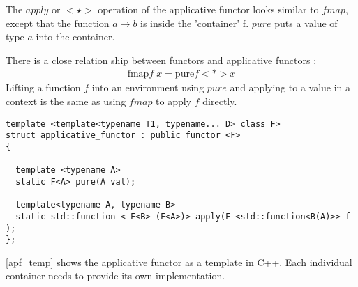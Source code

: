 \documentclass[12pt,fleqn]{article}
\begin{document}
The $apply$ or $<\star>$ operation of the applicative functor looks similar to $fmap$, except that the function $a \rightarrow b$ is inside the 'container' f.
$pure$ puts a value of type $a$ into the container.

There is a close relation ship between functors and applicative functors :
\begin{eqnarray*}
  \mbox{fmap} f \; x = \mbox{pure} f <*> x
\end{eqnarray*} 
Lifting a function $f$ into an environment using $pure$ and applying to a value in a context is the same as using $fmap$ to apply $f$ directly.
\begin{lstlisting}[caption=applicative functor template in C++, label=apf_temp]
template <template<typename T1, typename... D> class F> 
struct applicative_functor : public functor <F>
{

  template <typename A> 
  static F<A> pure(A val);

  template<typename A, typename B>
  static std::function < F<B> (F<A>)> apply(F <std::function<B(A)>> f );
};
\end{lstlisting}

\ref{apf_temp} shows the applicative functor as a template in C++. 
Each individual container needs to provide its own implementation. 
\end{document}
